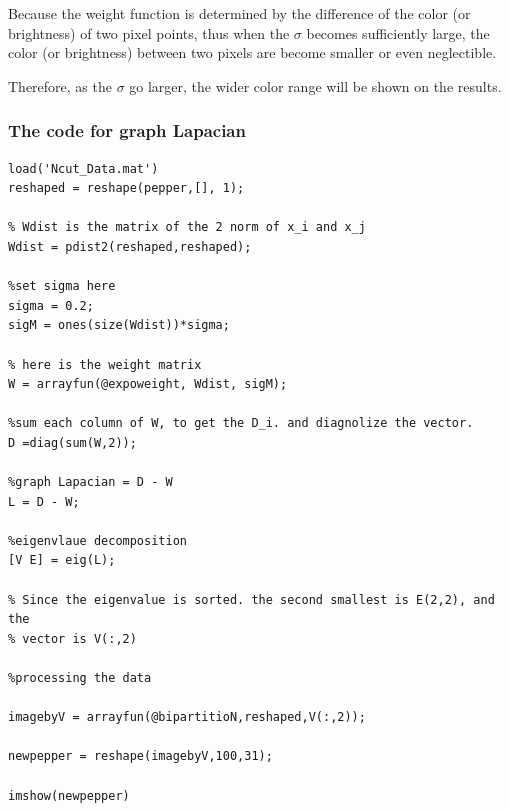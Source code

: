 \documentclass{article}
\begin{document}
Because the weight function is determined by the difference of the color (or brightness) of two pixel points, thus when the $\sigma$ becomes sufficiently large, the color (or brightness) between two pixels are become smaller or even neglectible.

Therefore, as the $\sigma$ go larger, the wider color range will be shown on the results.
\newpage
\subsubsection*{The code for graph Lapacian}
\begin{lstlisting}
load('Ncut_Data.mat')
reshaped = reshape(pepper,[], 1);

% Wdist is the matrix of the 2 norm of x_i and x_j
Wdist = pdist2(reshaped,reshaped);

%set sigma here
sigma = 0.2;
sigM = ones(size(Wdist))*sigma;

% here is the weight matrix
W = arrayfun(@expoweight, Wdist, sigM);

%sum each column of W, to get the D_i. and diagnolize the vector.
D =diag(sum(W,2));

%graph Lapacian = D - W
L = D - W;

%eigenvlaue decomposition
[V E] = eig(L);

% Since the eigenvalue is sorted. the second smallest is E(2,2), and the
% vector is V(:,2)

%processing the data

imagebyV = arrayfun(@bipartitioN,reshaped,V(:,2));

newpepper = reshape(imagebyV,100,31);

imshow(newpepper)



\end{lstlisting}
\end{document}
